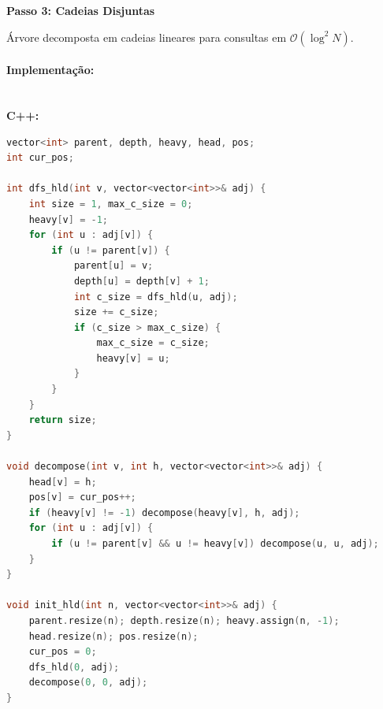 \hfill
%
\begin{minipage}[t]{0.31\textwidth}
    \centering
    \textbf{Passo 3: Cadeias Disjuntas}\\
    \vspace{0.2cm}

    \vspace{0.2cm}
    \footnotesize
    \raggedright
    Árvore decomposta em cadeias lineares para consultas em $\mathcal{O}(\log^2 N)$.
\end{minipage}

\vspace{0.3cm}

\paragraph{Implementação: }\mbox{}\\
\textbf{C++:}
\begin{lstlisting}[language=C++]
vector<int> parent, depth, heavy, head, pos;
int cur_pos;

int dfs_hld(int v, vector<vector<int>>& adj) {
    int size = 1, max_c_size = 0;
    heavy[v] = -1;
    for (int u : adj[v]) {
        if (u != parent[v]) {
            parent[u] = v;
            depth[u] = depth[v] + 1;
            int c_size = dfs_hld(u, adj);
            size += c_size;
            if (c_size > max_c_size) {
                max_c_size = c_size;
                heavy[v] = u;
            }
        }
    }
    return size;
}

void decompose(int v, int h, vector<vector<int>>& adj) {
    head[v] = h;
    pos[v] = cur_pos++;
    if (heavy[v] != -1) decompose(heavy[v], h, adj);
    for (int u : adj[v]) {
        if (u != parent[v] && u != heavy[v]) decompose(u, u, adj);
    }
}

void init_hld(int n, vector<vector<int>>& adj) {
    parent.resize(n); depth.resize(n); heavy.assign(n, -1);
    head.resize(n); pos.resize(n);
    cur_pos = 0;
    dfs_hld(0, adj);
    decompose(0, 0, adj);
}
\end{lstlisting}
\newpage
